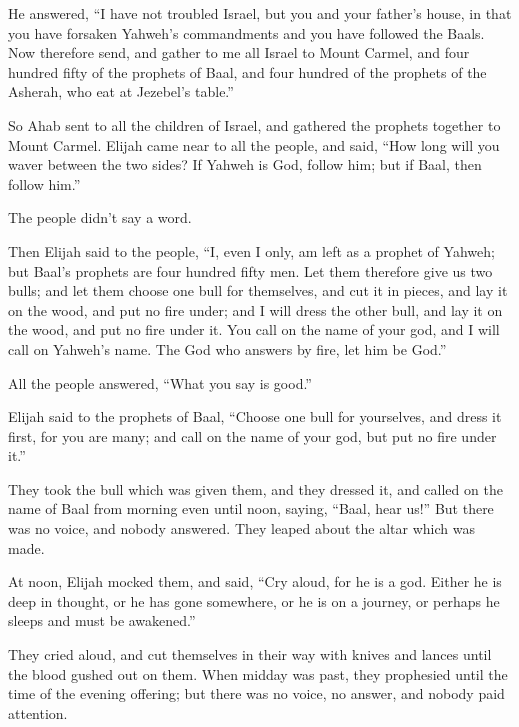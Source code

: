  He answered, ``I have not troubled Israel, but you and
your father's house, in that you have forsaken Yahweh's commandments and
you have followed the Baals.  Now therefore send, and
gather to me all Israel to Mount Carmel, and four hundred fifty of the
prophets of Baal, and four hundred of the prophets of the Asherah, who
eat at Jezebel's table.''

 So Ahab sent to all the children of Israel, and gathered
the prophets together to Mount Carmel.  Elijah came near
to all the people, and said, ``How long will you waver between the two
sides? If Yahweh is God, follow him; but if Baal, then follow him.''

The people didn't say a word.

 Then Elijah said to the people, ``I, even I only, am
left as a prophet of Yahweh; but Baal's prophets are four hundred fifty
men.  Let them therefore give us two bulls; and let them
choose one bull for themselves, and cut it in pieces, and lay it on the
wood, and put no fire under; and I will dress the other bull, and lay it
on the wood, and put no fire under it.  You call on the
name of your god, and I will call on Yahweh's name. The God who answers
by fire, let him be God.''

All the people answered, ``What you say is good.''

 Elijah said to the prophets of Baal, ``Choose one bull
for yourselves, and dress it first, for you are many; and call on the
name of your god, but put no fire under it.''

 They took the bull which was given them, and they
dressed it, and called on the name of Baal from morning even until noon,
saying, ``Baal, hear us!'' But there was no voice, and nobody answered.
They leaped about the altar which was made.

 At noon, Elijah mocked them, and said, ``Cry aloud, for
he is a god. Either he is deep in thought, or he has gone somewhere, or
he is on a journey, or perhaps he sleeps and must be awakened.''

 They cried aloud, and cut themselves in their way with
knives and lances until the blood gushed out on them. 
When midday was past, they prophesied until the time of the evening
offering; but there was no voice, no answer, and nobody paid attention.

